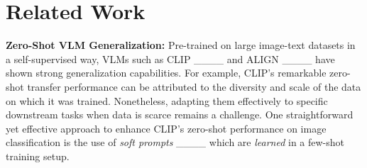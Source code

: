 \section{Related Work}
\noindent\textbf{Zero-Shot VLM Generalization:}
Pre-trained on large image-text datasets in a self-supervised way, VLMs such as CLIP ____ and ALIGN ____ have shown strong generalization capabilities. For example, CLIP's remarkable zero-shot transfer performance can be attributed to the diversity and scale of the data on which it was trained. Nonetheless, adapting them effectively to specific downstream tasks when data is scarce remains a challenge. One straightforward yet effective approach to enhance CLIP’s zero-shot performance on image classification is the use of \textit{soft prompts} ____ which are \textit{learned} in a few-shot training setup. 



